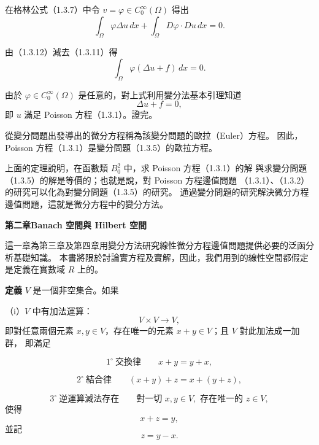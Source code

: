 \documentclass[11pt,a4paper,twoside]{article}
\newcommand{\pnum}[1]{%
    \makebox[0pt][r]{%
        \scriptsize\textbf{[#1]}\hspace{0.7em}%
    }%
}
\begin{document}
\noindent
\pnum{24}
在格林公式（1.3.7）中令
$v=\varphi\in C_0^\infty(\Omega)$ 得出
\begin{equation}
    \int_{\Omega}\varphi\Delta u\,dx
    +
    \int_{\Omega}D\varphi\cdot Du\,dx
    =
    0.
    \tag{1.3.12}
\end{equation}

由（1.3.12）減去（1.3.11）得
\[
    \int_{\Omega}\varphi(\Delta u+f)\,dx=0.
\]

\newpage

\noindent
\pnum{25}
由於 $\varphi\in C_0^\infty(\Omega)$ 是任意的，對上式利用變分法基本引理知道
\[
    \Delta u+f=0,
\]
即 $u$ 滿足 Poisson 方程（1.3.1）。\qquad 證完。

\noindent
\pnum{26}
從變分問題出發導出的微分方程稱為該變分問題的歐拉（Euler）方程。
因此，Poisson 方程（1.3.1）是變分問題（1.3.5）的歐拉方程。

\noindent
\pnum{27}
上面的定理說明，在函數類 $B_0^2$ 中，求 Poisson 方程（1.3.1）的解
與求變分問題（1.3.5）的解是等價的；也就是說，對 Poisson 方程邊值問題
（1.3.1）、（1.3.2）的研究可以化為對變分問題（1.3.5）的研究。
通過變分問題的研究解決微分方程邊值問題，這就是微分方程中的變分方法。

\newpage

\begin{center}
    {\Large\bfseries 第二章\qquad Banach 空間與 Hilbert 空間}
\end{center}

\vspace{1.2em}

\noindent
\pnum{28}
這一章為第三章及第四章用變分方法研究線性微分方程邊值問題提供必要的泛函分析基礎知識。
本書將限於討論實方程及實解，因此，我們用到的線性空間都假定是定義在實數域 $R$ 上的。

\noindent
\pnum{29}
\textbf{定義}\quad
$V$ 是一個非空集合。如果

\noindent
（i）$V$ 中有加法運算：
\[
    V\times V\longrightarrow V,
\]
即對任意兩個元素 $x,y\in V$，存在唯一的元素 $x+y\in V$；且 $V$ 對此加法成一加群，
即滿足

\[
    1^\circ\ \text{交換律}\qquad x+y=y+x,
\]

\[
    2^\circ\ \text{結合律}\qquad (x+y)+z=x+(y+z),
\]

\[
    3^\circ\ \text{逆運算減法存在}\qquad
    \text{對一切 }x,y\in V,\text{ 存在唯一的 }z\in V,
\]
使得
\[
    x+z=y,
\]
並記
\[
    z=y-x.
\]
\end{document}
